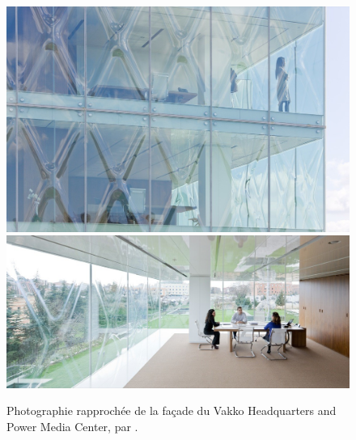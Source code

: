 \documentclass[11pt,titlepage]{article}
\begin{document}
\begin{figure}[H]
    \centering
    \includegraphics[width=\linewidth]{img/bulle/Vakko_ext.jpg}
    \includegraphics[width=\linewidth]{img/bulle/Vakko_int.jpg}
    \caption{Photographie rapprochée de la façade du Vakko Headquarters and Power Media Center, par \cite{VekkoHQ}.}
    \label{fig:VakkoHQ}
\end{figure}

\newpage

\printbibliography
\end{document}
